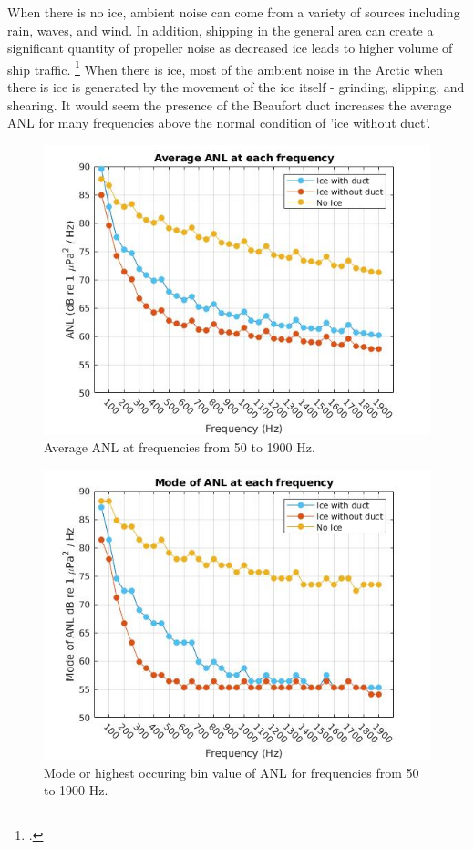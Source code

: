 When there is no ice, ambient noise can come from a variety of sources including rain, waves, and wind. In addition, shipping in the general area can create a significant quantity of propeller noise as decreased ice leads to higher volume of ship traffic. \footcite[]{ship_traffic} When there is ice, most of the ambient noise in the Arctic when there is ice is generated by the movement of the ice itself - grinding, slipping, and shearing. It would seem the presence of the Beaufort duct increases the average ANL for many frequencies above the normal condition of 'ice without duct'. 



\begin{figure}[p]
\centering
\includegraphics[scale=0.6]{Figures/Average_ANL.jpg}
\caption{Average ANL at frequencies from 50 to 1900 Hz.}
\label{fig_avg_anl}
\end{figure}

\begin{figure}[p]
\centering
\includegraphics[scale=0.6]{Figures/mode_ANL_allfreqs.jpg}
\caption{Mode or highest occuring bin value of ANL for frequencies from 50 to 1900 Hz.}
\label{fig_mode}
\end{figure}

